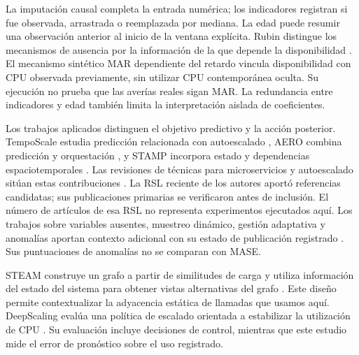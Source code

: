 La imputación causal completa la entrada numérica; los indicadores registran si fue observada, arrastrada o reemplazada por mediana. La edad puede resumir una observación anterior al inicio de la ventana explícita. Rubin distingue los mecanismos de ausencia por la información de la que depende la disponibilidad \cite{rubinmissing}. El mecanismo sintético MAR dependiente del retardo vincula disponibilidad con CPU observada previamente, sin utilizar CPU contemporánea oculta. Su ejecución no prueba que las averías reales sigan MAR. La redundancia entre indicadores y edad también limita la interpretación aislada de coeficientes.

Los trabajos aplicados distinguen el objetivo predictivo y la acción posterior. TempoScale estudia predicción relacionada con autoescalado \cite{temposcale}, AERO combina predicción y orquestación \cite{aero}, y STAMP incorpora estado y dependencias espaciotemporales \cite{stamp}. Las revisiones de técnicas para microservicios y autoescalado sitúan estas contribuciones \cite{aimapping,autoscaling2025}. La RSL reciente de los autores aportó referencias candidatas; sus publicaciones primarias se verificaron antes de inclusión. El número de artículos de esa RSL no representa experimentos ejecutados aquí. Los trabajos sobre variables ausentes, muestreo dinámico, gestión adaptativa y anomalías aportan contexto adicional con su estado de publicación registrado \cite{ibn,radar2026,taxonomy2026,ibm2026}. Sus puntuaciones de anomalías no se comparan con MASE.

STEAM construye un grafo a partir de similitudes de carga y utiliza información del estado del sistema para obtener vistas alternativas del grafo \cite{steamgraph}. Este diseño permite contextualizar la adyacencia estática de llamadas que usamos aquí. DeepScaling evalúa una política de escalado orientada a estabilizar la utilización de CPU \cite{deepscaling}. Su evaluación incluye decisiones de control, mientras que este estudio mide el error de pronóstico sobre el uso registrado.


